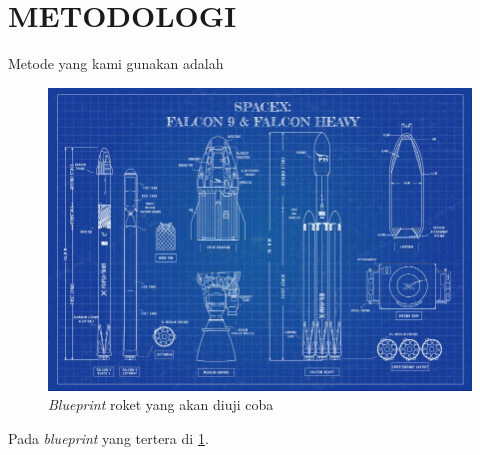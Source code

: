 \section{METODOLOGI}

Metode yang kami gunakan adalah \lipsum[10]

\begin{figure} [ht] \centering
  \includegraphics[scale=0.45]{gambar/blueprint.jpg}
  \caption{\emph{Blueprint} roket yang akan diuji coba}
  \label{fig:blueprint}
\end{figure}

Pada \emph{blueprint} yang tertera di \ref{fig:blueprint}. \lipsum[11]

\lipsum[12]
